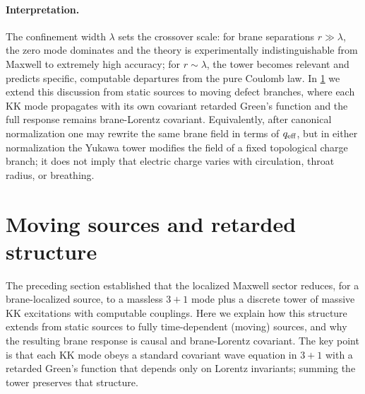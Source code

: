 \documentclass[11pt]{article}
\newcommand{\lam}{\lambda}      %
\newcommand{\qeff}{q_{\rm eff}}
\begin{document}
\paragraph{Interpretation.}
The confinement width \(\lam\) sets the crossover scale: for brane separations
\(r\gg \lam\), the zero mode dominates and the theory is experimentally
indistinguishable from Maxwell to extremely high accuracy; for \(r\sim\lam\), the
tower becomes relevant and predicts specific, computable departures from the pure
Coulomb law. In \cref{sec:moving_sources} we extend this discussion from static
sources to moving defect branches, where each KK mode propagates with its own
covariant retarded Green's function and the full response remains brane-Lorentz
covariant. Equivalently, after canonical normalization one may rewrite the same
brane field in terms of \(\qeff\), but in either normalization the Yukawa tower
modifies the field of a fixed topological charge branch; it does not imply that
electric charge varies with circulation, throat radius, or breathing.

\section{Moving sources and retarded structure}
\label{sec:moving_sources}

The preceding section established that the localized Maxwell sector reduces, for a
brane-localized source, to a massless \(3+1\) mode plus a discrete tower of massive
KK excitations with computable couplings. Here we explain how this structure
extends from static sources to fully time-dependent (moving) sources, and why the
resulting brane response is causal and brane-Lorentz covariant. The key point is
that each KK mode obeys a standard covariant wave equation in \(3+1\) with a
retarded Green's function that depends only on Lorentz invariants; summing the
tower preserves that structure.
\end{document}
